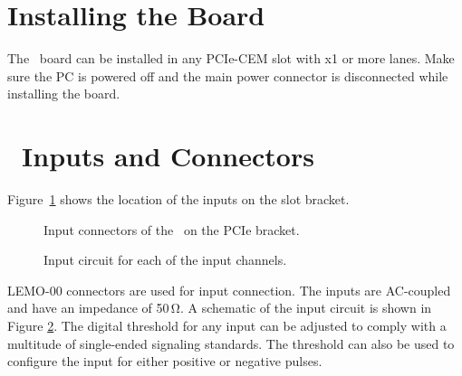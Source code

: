 \section{Installing the Board}
The \deviceName\ board can be installed in any PCIe-CEM slot with x1 or more
lanes.  Make sure the PC is powered off and the main power connector is
disconnected while installing the board.\par

%
\section{\deviceName\ Inputs and Connectors}
    Figure~\ref{fig:bracket} shows the location of the inputs on the slot
    bracket.  %
    \begin{figure}[hb]
        \begin{center}
            \caption{
                Input connectors of the \deviceName\ on the PCIe
                bracket.%
                \label{fig:bracket}
            }
        \end{center}
    \end{figure}
    \begin{figure}[hb]
        \begin{center}
            \caption{
                Input circuit for each of the input
                channels.
                \label{fig:inputcirc}
            }
        \end{center}
    \end{figure}

    LEMO-00 connectors are used for input connection. The inputs are AC-coupled
    and have an impedance of 50\,Ω.  A schematic of the input circuit is shown
    in Figure \ref{fig:inputcirc}.  The digital threshold for any input can be
    adjusted to comply with a multitude of single-ended signaling standards. 
    The threshold can also be used to configure the input for either positive
    or negative pulses.
    

